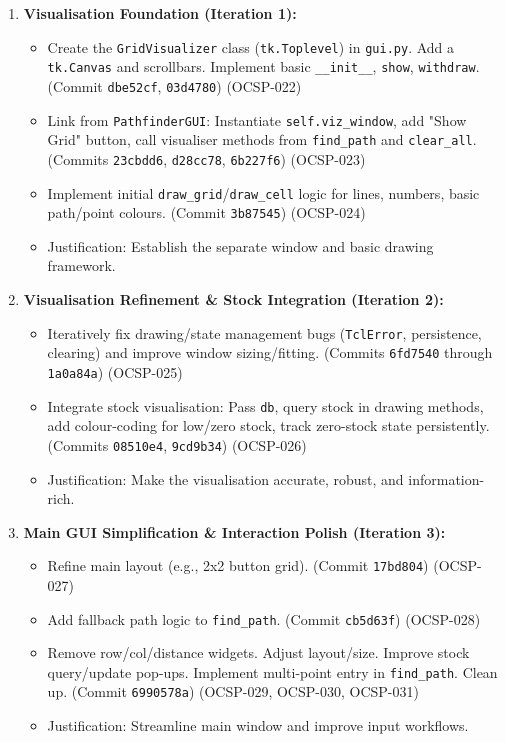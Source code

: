 \begin{enumerate}
	\item \textbf{Visualisation Foundation (Iteration 1):}
	\begin{itemize}
		\item Create the \verb|GridVisualizer| class (\verb|tk.Toplevel|) in \verb|gui.py|. Add a \verb|tk.Canvas| and scrollbars. Implement basic \verb|__init__|, \verb|show|, \verb|withdraw|. (Commit \verb|dbe52cf|, \verb|03d4780|) (OCSP-022)
		\item Link from \verb|PathfinderGUI|: Instantiate \verb|self.viz_window|, add "Show Grid" button, call visualiser methods from \verb|find_path| and \verb|clear_all|. (Commits \verb|23cbdd6|, \verb|d28cc78|, \verb|6b227f6|) (OCSP-023)
		\item Implement initial \verb|draw_grid|/\verb|draw_cell| logic for lines, numbers, basic path/point colours. (Commit \verb|3b87545|) (OCSP-024)
		\item Justification: Establish the separate window and basic drawing framework.
	\end{itemize}
	\item \textbf{Visualisation Refinement \& Stock Integration (Iteration 2):}
	\begin{itemize}
		\item Iteratively fix drawing/state management bugs (\verb|TclError|, persistence, clearing) and improve window sizing/fitting. (Commits \verb|6fd7540| through \verb|1a0a84a|) (OCSP-025)
		\item Integrate stock visualisation: Pass \verb|db|, query stock in drawing methods, add colour-coding for low/zero stock, track zero-stock state persistently. (Commits \verb|08510e4|, \verb|9cd9b34|) (OCSP-026)
		\item Justification: Make the visualisation accurate, robust, and information-rich.
	\end{itemize}
	\item \textbf{Main GUI Simplification \& Interaction Polish (Iteration 3):}
	\begin{itemize}
		\item Refine main layout (e.g., 2x2 button grid). (Commit \verb|17bd804|) (OCSP-027)
		\item Add fallback path logic to \verb|find_path|. (Commit \verb|cb5d63f|) (OCSP-028)
		\item Remove row/col/distance widgets. Adjust layout/size. Improve stock query/update pop-ups. Implement multi-point entry in \verb|find_path|. Clean up. (Commit \verb|6990578a|) (OCSP-029, OCSP-030, OCSP-031)
		\item Justification: Streamline main window and improve input workflows.
	\end{itemize}
\end{enumerate}

